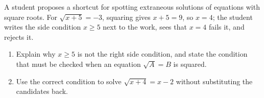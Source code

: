A student proposes a shortcut for spotting extraneous solutions of equations with square roots. For $\sqrt{x+5}=-3$, squaring gives $x+5=9$, so $x=4$; the student writes the side condition $x\ge5$ next to the work, sees that $x=4$ fails it, and rejects it.
\begin{enumerate}
\item[(a)] Explain why $x\ge5$ is not the right side condition, and state the condition that must be checked when an equation $\sqrt{A}=B$ is squared.
\item[(b)] Use the correct condition to solve $\sqrt{x+4}=x-2$ without substituting the candidates back.
\end{enumerate}
